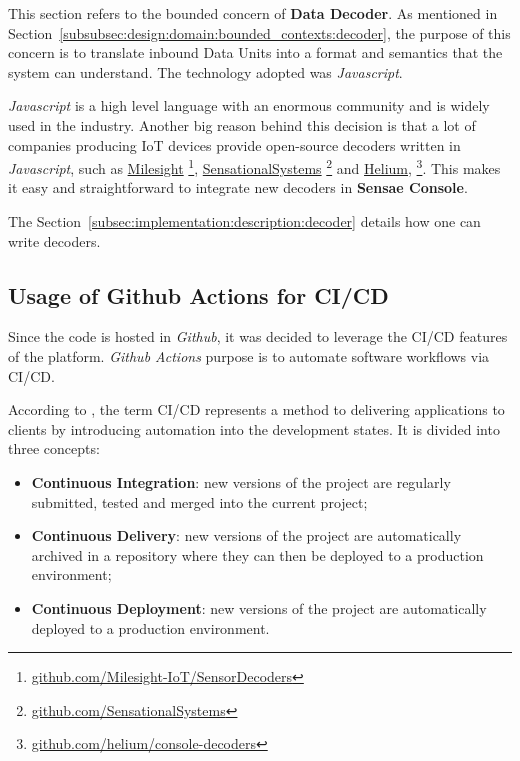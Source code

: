 This section refers to the bounded concern of \textbf{Data Decoder}. As mentioned in Section~\ref{subsubsec:design:domain:bounded_contexts:decoder}, the purpose of this concern is to translate inbound Data Units into a format and semantics that the system can understand. The technology adopted was \textit{Javascript}.

\textit{Javascript} is a high level language with an enormous community and is widely used in the industry. Another big reason behind this decision is that a lot of companies producing \gls{IoT} devices provide open-source decoders written in \textit{Javascript}, such as \href{https://github.com/Milesight-IoT/SensorDecoders}{Milesight} \footnote{\href {https://github.com/Milesight-IoT/SensorDecoders}{github.com/Milesight-IoT/SensorDecoders}}, \href{https://github.com/SensationalSystems}{SensationalSystems} \footnote{\href {https://github.com/SensationalSystems}{github.com/SensationalSystems}} and \href{https://github.com/helium/console-decoders}{Helium}, \footnote{\href {https://github.com/helium/console-decoders}{github.com/helium/console-decoders}}. This makes it easy and straightforward to integrate new decoders in \textbf{Sensae Console}.

The Section~\ref{subsec:implementation:description:decoder} details how one can write decoders.

\subsection{Usage of Github Actions for CI/CD}
\label{subsec:implementation:decisions:actions}

Since the code is hosted in \textit{Github}, it was decided to leverage the CI/CD features of the platform. \textit{Github Actions} purpose is to automate software workflows via CI/CD.

According to \cite{cicd}, the term CI/CD represents a method to delivering applications to clients by introducing automation into the development states.
It is divided into three concepts:

\begin{itemize}
    \item \textbf{Continuous Integration}: new versions of the project are regularly submitted, tested and merged into the current project;
    \item \textbf{Continuous Delivery}: new versions of the project are automatically archived in a repository where they can then be deployed to a production environment;
    \item \textbf{Continuous Deployment}: new versions of the project are automatically deployed to a production environment.
\end{itemize}

